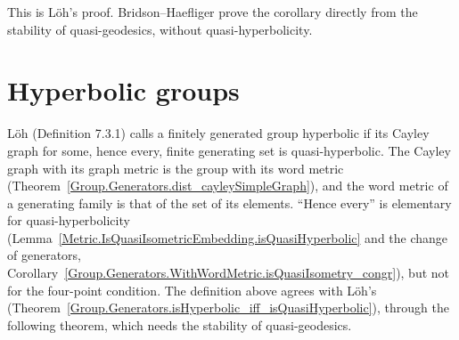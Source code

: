 
This is L\"oh's proof. Bridson--Haefliger prove the corollary directly from the stability of
quasi-geodesics, without quasi-hyperbolicity.

\section*{Hyperbolic groups}


L\"oh (Definition 7.3.1) calls a finitely generated group hyperbolic if its Cayley graph for some,
hence every, finite generating set is quasi-hyperbolic. The Cayley graph with its graph metric is
the group with its word metric
(Theorem~\ref{Group.Generators.dist_cayleySimpleGraph}), and the word metric of a generating
family is that of the set of its elements. ``Hence every'' is elementary for quasi-hyperbolicity
(Lemma~\ref{Metric.IsQuasiIsometricEmbedding.isQuasiHyperbolic} and the change of generators,
Corollary~\ref{Group.Generators.WithWordMetric.isQuasiIsometry_congr}), but not for the
four-point condition. The definition above agrees with L\"oh's
(Theorem~\ref{Group.Generators.isHyperbolic_iff_isQuasiHyperbolic}), through the following
theorem, which needs the stability of quasi-geodesics.

